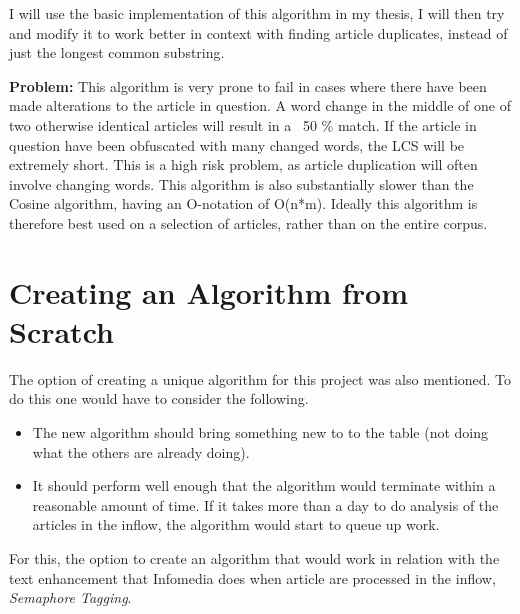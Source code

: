 I will use the basic implementation of this algorithm in my thesis, I will then try and modify it to work better in context with finding article duplicates, instead of just the longest common substring.

\textbf{Problem:} This algorithm is very prone to fail in cases where there have been made alterations to the article in question. A word change in the middle of one of two otherwise identical articles will result in a ~50 \% match. If the article in question have been obfuscated with many changed words, the LCS will be extremely short. This is a high risk problem, as article duplication will often involve changing words. This algorithm is also substantially slower than the Cosine algorithm, having an O-notation of O(n*m). Ideally this algorithm is therefore best used on a selection of articles, rather than on the entire corpus.

\section{Creating an Algorithm from Scratch}
The option of creating a unique algorithm for this project was also mentioned. To do this one would have to consider the following.

\begin{itemize}
	\item The new algorithm should bring something new to to the table (not doing what the others are already doing).
	\item It should perform well enough that the algorithm would terminate within a reasonable amount of time. If it takes more than a day to do analysis of the articles in the inflow, the algorithm would start to queue up work.
\end{itemize}

For this, the option to create an algorithm that would work in relation with the text enhancement that Infomedia does when article are processed in the inflow, \textit{Semaphore Tagging}.

